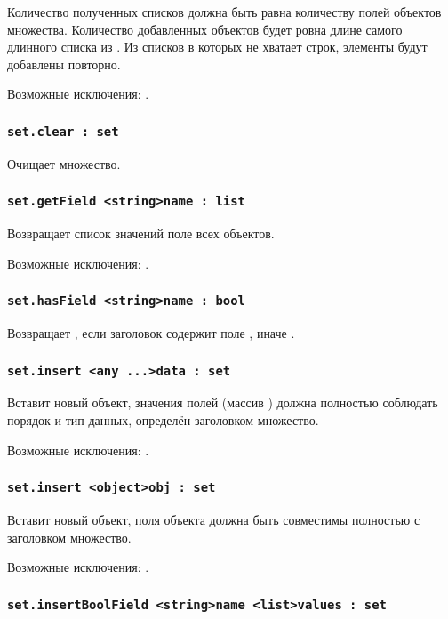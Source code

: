 Количество полученных списков должна быть равна количеству полей объектов множества. Количество добавленных объектов будет ровна длине самого длинного списка из . Из списков в которых не хватает строк, элементы будут добавлены повторно.

Возможные исключения: .

\subsubsection{\lstinline|set.clear : set|}

Очищает множество.

\subsubsection{\lstinline|set.getField <string>name : list|}

Возвращает список значений поле  всех объектов.

Возможные исключения: .

\subsubsection{\lstinline|set.hasField <string>name : bool|}

Возвращает \true, если заголовок содержит поле , иначе \false.

\subsubsection{\lstinline|set.insert <any ...>data : set|}

Вставит новый объект, значения полей (массив ) должна полностью соблюдать порядок и тип данных, определён заголовком множество.

Возможные исключения: .

\subsubsection{\lstinline|set.insert <object>obj : set|}

Вставит новый объект, поля объекта  должна быть совместимы полностью с заголовком множество.

Возможные исключения: .

\subsubsection{\lstinline|set.insertBoolField <string>name <list>values : set|}

